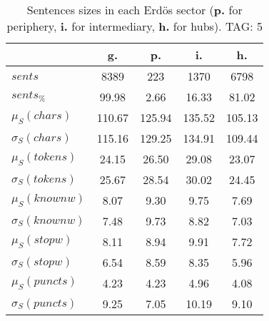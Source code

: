 \begin{table}[h!]
\begin{center}
\begin{tabular}{| l | c | c | c | c |}\hline
 & g. & p. & i. & h. \\\hline
$sents$ & 8389  & 223  & 1370  & 6798 \\\hline
$sents_{\%}$ & 99.98  & 2.66  & 16.33  & 81.02 \\\hline
$\mu_S(chars)$ & 110.67  & 125.94  & 135.52  & 105.13 \\\hline
$\sigma_S(chars)$ & 115.16  & 129.25  & 134.91  & 109.44 \\\hline
$\mu_S(tokens)$ & 24.15  & 26.50  & 29.08  & 23.07 \\\hline
$\sigma_S(tokens)$ & 25.67  & 28.54  & 30.02  & 24.45 \\\hline
$\mu_S(knownw)$ & 8.07  & 9.30  & 9.75  & 7.69 \\\hline
$\sigma_S(knownw)$ & 7.48  & 9.73  & 8.82  & 7.03 \\\hline
$\mu_S(stopw)$ & 8.11  & 8.94  & 9.91  & 7.72 \\\hline
$\sigma_S(stopw)$ & 6.54  & 8.59  & 8.35  & 5.96 \\\hline
$\mu_S(puncts)$ & 4.23  & 4.23  & 4.96  & 4.08 \\\hline
$\sigma_S(puncts)$ & 9.25  & 7.05  & 10.19  & 9.10 \\\hline
\end{tabular}
\caption{Sentences sizes in each Erd\"os sector ({{\bf p.}} for periphery, {{\bf i.}} for intermediary, {{\bf h.}} for hubs). TAG: 5}
\end{center}
\end{table}
